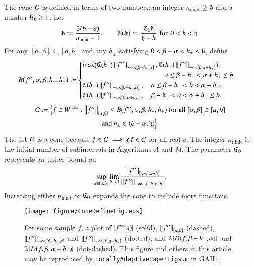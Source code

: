 \documentclass[review]{elsarticle}
\theoremstyle{definition}
\renewcommand{\cw}{W}
\DeclareMathOperator{\ninit}{ninit}
\begin{document}
The cone $\cc$ is defined in terms of two numbers: an integer $n_{\ninit} \ge 5$
and a  number $\fC_0 \ge 1$. Let
\begin{equation}
\label{hCdef}
\fh := \frac{3(b-a)}{n_{\ninit}-1}, \qquad \fC(h) := \frac{\fC_0 \fh}{\fh - h}
\mbox{\, for \,} 0<h<\fh.
\end{equation}
For any $[\alpha, \beta] \subseteq [a,b]$ and any $h_{\pm}$ satisfying $0 <
\beta - \alpha < h_{\pm} < \fh$, define
\begin{equation} \label{tbdef}
B(f'',\alpha,\beta,h_-,h_+) :=
\begin{cases}
   \max\bigl(\fC(h_{-}) \norm[-\infty,{[\beta-h_-,\alpha]}]{f''},\fC(h_{+})
   \norm[-\infty,{[\beta, \alpha+h_+]}]{f''}\bigr),
\\                                             \hspace{26ex} a \le \beta- h_- <  \alpha + h_+ \le b,
\\ \fC(h_{-}) \norm[-\infty,{[\beta-h_-,\alpha]}]{f''},  \quad a \le \beta- h_- < b< \alpha + h_+,
\\ \fC(h_{+}) \norm[-\infty,{[\beta, \alpha+h_+]}]{f''},
\quad \beta- h_- <  a  < \alpha + h_+ \le b.
\end{cases}
\end{equation}
\begin{multline} \label{conedef}
 \cc := \Bigl \{
 f  \in    \cw^{2,\infty}:   \norm[{[\alpha,\beta]}]{f''}  \le B(f'',\alpha,\beta,h_-,h_+)
 \text{ for all } [\alpha,\beta] \subset [a,b]
\\ \text{and } h_{\pm} \in (\beta - \alpha,  \fh)  \Bigr \}.
\end{multline}
The set $\cc$ is a cone because $f \in \cc \implies cf \in \cc$ for all real
$c$. The integer $n_{\ninit}$ is the initial number of subintervals in
Algorithms $A$ and $M$. The parameter $\fC_0$ represents an upper bound on
\[
\sup_{x \in (a,b)} \lim_{h \to 0} \frac{\norm[{[x-h,x+h]}]{f''}}{\norm[-\infty,{[x-h,x+h]}]{f''}}.
\]
 Increasing either $n_{\ninit}$ or $\fC_0$ expands the cone to
include more functions.

\begin{figure}
	\centering
	\texttt{[image: figure/ConeDefineFig.eps]}
	\caption{For some sample $f$, a plot of $\abs{f''(x)}$ (solid), 
	$\norm[{[\alpha,\beta]}]{f''}$ (dashed), 
   $\norm[-\infty,{[\beta - h_-,\alpha]}]{f''}$ and $\norm[-\infty,{[\beta,
    \alpha+h_+]}]{f''}$ (dotted), and 
    $2\abs{D(f,\beta - h_-,\alpha)}$ and $2\abs{D(f,\beta,\alpha+h_+)}$ (dot-dashed).  
    This figure and others in this article may be reproduced by 
    \texttt{LocallyAdaptivePaperFigs.m} in GAIL \cite{ChoEtal15a}.
    \label{fig:ConeDef}}
\end{figure}
\end{document}
